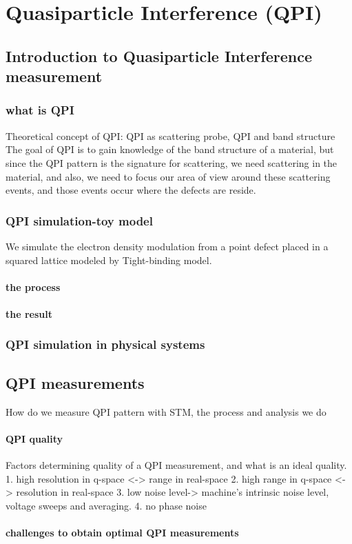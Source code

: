 \chapter{Quasiparticle Interference (QPI)}
\section{Introduction to Quasiparticle Interference measurement}

\subsection{what is \ac{QPI}}
Theoretical concept of QPI: QPI as scattering probe, QPI and band structure
The goal of QPI is to gain knowledge of the band structure of a material, but since the QPI pattern is the signature for scattering, we need scattering in the material, and also, we need to focus our area of view around these scattering events, and those events occur where the defects are reside. 


\subsection{\ac{QPI} simulation-toy model}
We simulate the electron density modulation from a point defect placed in a squared lattice modeled by Tight-binding model.
\subsubsection{the process}
\subsubsection{the result}
\subsection{\ac{QPI} simulation in physical systems}

\section{QPI measurements}
How do we measure QPI pattern with STM, the process and analysis we do 
\subsubsection{QPI quality}
Factors determining quality of a QPI measurement, and what is an ideal quality. 
1. high resolution in q-space <-> range in real-space
2. high range in q-space <-> resolution in real-space
3. low noise level-> machine's intrinsic noise level, voltage sweeps and averaging.
4. no phase noise 
\subsubsection{challenges to obtain optimal QPI measurements}
